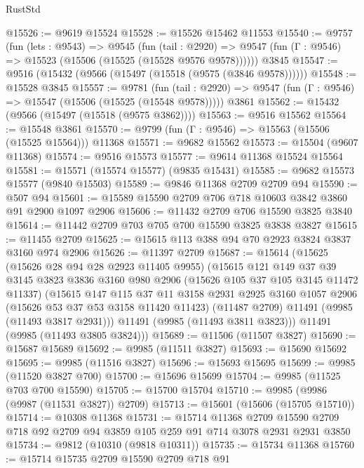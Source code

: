 \begin{lexlean}{RustStd}
\begin{coremodule}
@15526 := @9619 @15524
@15528 := @15526 @15462 @11553
@15540 := @9757
    (fun (lets : @9543) =>
    @9545
      (fun (tail : @2920) =>
      @9547 (fun (Γ : @9546) => @15523 (@15506 (@15525 (@15528 @9576 @9578))))))
    @3845
@15547 := @9516 (@15432 (@9566 (@15497 (@15518 (@9575 (@3846 @9578))))))
@15548 := @15528 @3845
@15557 := @9781
    (fun (tail : @2920) => @9547 (fun (Γ : @9546) => @15547 (@15506 (@15525 (@15548 @9578)))))
    @3861
@15562 := @15432 (@9566 (@15497 (@15518 (@9575 @3862))))
@15563 := @9516 @15562
@15564 := @15548 @3861
@15570 := @9799 (fun (Γ : @9546) => @15563 (@15506 (@15525 @15564))) @11368
@15571 := @9682 @15562
@15573 := @15504 (@9607 @11368)
@15574 := @9516 @15573
@15577 := @9614 @11368 @15524 @15564
@15581 := @15571 (@15574 @15577) (@9835 @15431)
@15585 := @9682 @15573 @15577 (@9840 @15503)
@15589 := @9846 @11368 @2709 @2709 @94
@15590 := @507 @94
@15601 := @15589 @15590 @2709 @706 @718 @10603 @3842 @3860 @91 @2900 @1097 @2906
@15606 := @11432 @2709 @706 @15590 @3825 @3840
@15614 := @11442 @2709 @703 @705 @700 @15590 @3825 @3838 @3827
@15615 := @11455 @2709
@15625 := @15615 @113 @388 @94 @70 @2923 @3824 @3837 @3160 @974 @2906
@15626 := @11397 @2709
@15687 := @15614
    (@15625
      (@15626 @28 @94 @28 @2923 @11405 @9955)
      (@15615
        @121
        @149
        @37
        @39
        @3145
        @3823
        @3836
        @3160
        @980
        @2906
        (@15626 @105 @37 @105 @3145 @11472 @11337)
        (@15615
          @147
          @115
          @37
          @11
          @3158
          @2931
          @2925
          @3160
          @1057
          @2906
          (@15626 @53 @37 @53 @3158 @11420 @11423)
          (@11487 @2709)
          @11491
          (@9985 (@11493 @3817 @2931)))
        @11491
        (@9985 (@11493 @3811 @3823)))
      @11491
      (@9985 (@11493 @3805 @3824)))
@15689 := @11506 (@11507 @3827)
@15690 := @15687 @15689
@15692 := @9985 (@11511 @3827)
@15693 := @15690 @15692
@15695 := @9985 (@11516 @3827)
@15696 := @15693 @15695
@15699 := @9985 (@11520 @3827 @700)
@15700 := @15696 @15699
@15704 := @9985 (@11525 @703 @700 @15590)
@15705 := @15700 @15704
@15710 := @9985 (@9986 (@9987 (@11531 @3827)) @2709)
@15713 := @15601 (@15606 (@15705 @15710))
@15714 := @10308 @11368
@15731 := @15714
    @11368
    @2709
    @15590
    @2709
    @718
    @92
    @2709
    @94
    @3859
    @105
    @259
    @91
    @714
    @3078
    @2931
    @2931
    @3850
@15734 := @9812 (@10310 (@9818 @10311))
@15735 := @15734 @11368
@15760 := @15714
    @15735
    @2709
    @15590
    @2709
    @718
    @91

\end{coremodule}
\end{lexlean}
